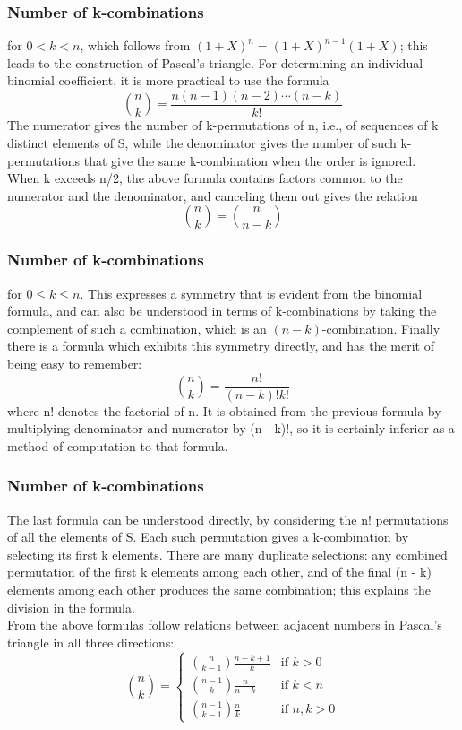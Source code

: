 \documentclass{beamer}
\begin{document}
\begin{frame}
\frametitle{Number of k-combinations}
for $0 < k < n$, which follows from $ (1 + X)^n = (1 + X)^{n-1}(1+X)$; this leads to the construction of Pascal's triangle.
For determining an individual binomial coefficient, it is more practical to use the formula
$${\binom {n}{k}}=\frac{n(n-1)(n-2)\cdots (n-k)}{k!}$$
The numerator gives the number of k-permutations of n, i.e., of sequences of k distinct elements of S, while the denominator gives the number of such k-permutations that give the same k-combination when the order is ignored.\\
When k exceeds n/2, the above formula contains factors common to the numerator and the denominator, and canceling them out gives the relation
$${\binom {n}{k}}={\binom {n}{n-k}}$$
\end{frame}

\begin{frame}
\frametitle{Number of k-combinations}
for $0\le k\le n$. This expresses a symmetry that is evident from the binomial formula, and can also be understood in terms of k-combinations by taking the complement of such a combination, which is an $(n-k)$-combination.
Finally there is a formula which exhibits this symmetry directly, and has the merit of being easy to remember:
$${\binom {n}{k}}=\frac{n!}{(n-k)!k!}$$
where n! denotes the factorial of n. It is obtained from the previous formula by multiplying denominator and numerator by (n - k)!, so it is certainly inferior as a method of computation to that formula.\\
\end{frame}

\begin{frame}
\frametitle{Number of k-combinations}
The last formula can be understood directly, by considering the n! permutations of all the elements of S. Each such permutation gives a k-combination by selecting its first k elements. There are many duplicate selections: any combined permutation of the first k elements among each other, and of the final (n - k) elements among each other produces the same combination; this explains the division in the formula.\\
From the above formulas follow relations between adjacent numbers in Pascal's triangle in all three directions:
$${\binom {n}{k}}=
\begin{cases}
{\binom {n}{k-1}}\frac {n-k+1}{k} &\text{if } k>0\\
{\binom {n-1}{k}}\frac{n}{n-k}&\text{if }k<n\\
{\binom {n-1}{k-1}}\frac{n}{k}&\text{if } n,k>0
\end{cases}
$$
\end{frame}
\end{document}
